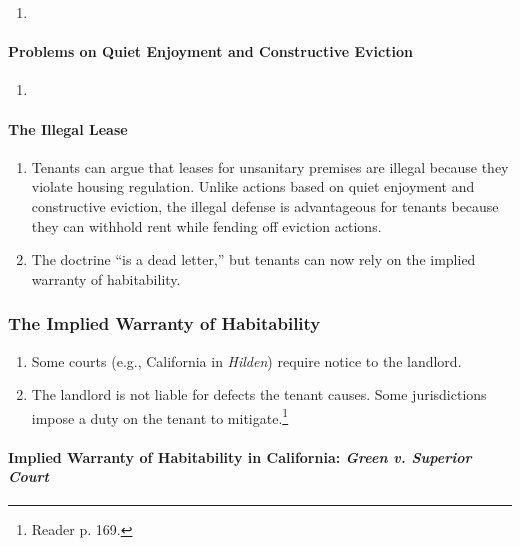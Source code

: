 \begin{enumerate}
    \item %
\end{enumerate}

\paragraph{Problems on Quiet Enjoyment and Constructive Eviction}

\begin{enumerate}
    \item %
\end{enumerate}

\paragraph{The Illegal Lease}

\begin{enumerate}
    \item Tenants can argue that leases for unsanitary premises are illegal 
    because they violate housing regulation. Unlike actions based on quiet 
    enjoyment and constructive eviction, the illegal defense is advantageous 
    for tenants because they can withhold rent while fending off eviction 
    actions.
    \item The doctrine ``is a dead letter,'' but tenants can now rely on the 
    implied warranty of habitability.
\end{enumerate}

\subsubsection{The Implied Warranty of Habitability}

\begin{enumerate}
    \item Some courts (e.g., California in \emph{Hilden}) require notice to 
    the landlord.
    \item The landlord is not liable for defects the tenant causes. Some 
    jurisdictions impose a duty on the tenant to mitigate.\footnote{Reader p. 
    169.}
\end{enumerate}

\paragraph{Implied Warranty of Habitability in California: \emph{Green v. 
Superior Court}}

